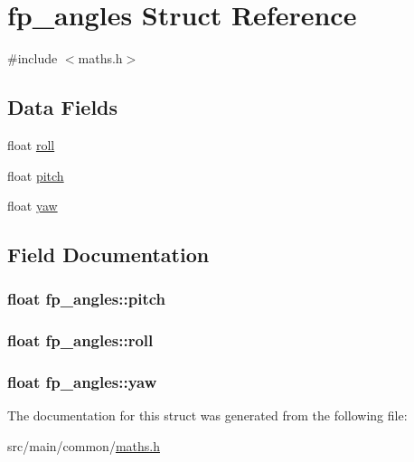 \hypertarget{structfp__angles}{\section{fp\+\_\+angles Struct Reference}
\label{structfp__angles}
}


{\ttfamily \#include $<$maths.\+h$>$}

\subsection*{Data Fields}
\begin{DoxyCompactItemize}
\item 
float \hyperlink{structfp__angles_a5efe44d03a15044f741583235f47c0d3}{roll}
\item 
float \hyperlink{structfp__angles_a53a267f0e0593e642ea08ec34b3958c7}{pitch}
\item 
float \hyperlink{structfp__angles_a3bf3731e75254e68fb9c2c39a925df2f}{yaw}
\end{DoxyCompactItemize}


\subsection{Field Documentation}
\hypertarget{structfp__angles_a53a267f0e0593e642ea08ec34b3958c7}{
\subsubsection[{pitch}]{\setlength{\rightskip}{0pt plus 5cm}float fp\+\_\+angles\+::pitch}}\label{structfp__angles_a53a267f0e0593e642ea08ec34b3958c7}
\hypertarget{structfp__angles_a5efe44d03a15044f741583235f47c0d3}{
\subsubsection[{roll}]{\setlength{\rightskip}{0pt plus 5cm}float fp\+\_\+angles\+::roll}}\label{structfp__angles_a5efe44d03a15044f741583235f47c0d3}
\hypertarget{structfp__angles_a3bf3731e75254e68fb9c2c39a925df2f}{
\subsubsection[{yaw}]{\setlength{\rightskip}{0pt plus 5cm}float fp\+\_\+angles\+::yaw}}\label{structfp__angles_a3bf3731e75254e68fb9c2c39a925df2f}


The documentation for this struct was generated from the following file\+:\begin{DoxyCompactItemize}
\item 
src/main/common/\hyperlink{maths_8h}{maths.\+h}\end{DoxyCompactItemize}
